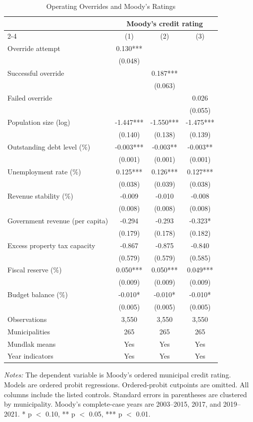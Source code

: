 \begin{table}[!htbp]
\centering
\caption{Operating Overrides and Moody's Ratings}
\label{tab:northeast_moodys_main}
\small
\begin{tabular}{lccc}
\toprule
 & \multicolumn{3}{c}{Moody's credit rating} \\
\cmidrule(lr){2-4}
 & (1) & (2) & (3) \\
\midrule
Override attempt & 0.130*** &  &  \\
 & (0.048) &  &  \\
Successful override &  & 0.187*** &  \\
 &  & (0.063) &  \\
Failed override &  &  & 0.026 \\
 &  &  & (0.055) \\
Population size (log) & -1.447*** & -1.550*** & -1.475*** \\
 & (0.140) & (0.138) & (0.139) \\
Outstanding debt level (\%) & -0.003*** & -0.003** & -0.003** \\
 & (0.001) & (0.001) & (0.001) \\
Unemployment rate (\%) & 0.125*** & 0.126*** & 0.127*** \\
 & (0.038) & (0.039) & (0.038) \\
Revenue stability (\%) & -0.009 & -0.010 & -0.008 \\
 & (0.008) & (0.008) & (0.008) \\
Government revenue (per capita) & -0.294 & -0.293 & -0.323* \\
 & (0.179) & (0.178) & (0.182) \\
Excess property tax capacity & -0.867 & -0.875 & -0.840 \\
 & (0.579) & (0.579) & (0.585) \\
Fiscal reserve (\%) & 0.050*** & 0.050*** & 0.049*** \\
 & (0.009) & (0.009) & (0.009) \\
Budget balance (\%) & -0.010* & -0.010* & -0.010* \\
 & (0.005) & (0.005) & (0.005) \\
\midrule
Observations & 3,550 & 3,550 & 3,550 \\
Municipalities & 265 & 265 & 265 \\
Mundlak means & Yes & Yes & Yes \\
Year indicators & Yes & Yes & Yes \\
\bottomrule
\end{tabular}
\vspace{0.05in}
\begin{minipage}{0.96\textwidth}\footnotesize\emph{Notes:} The dependent variable is Moody's ordered municipal credit rating. Models are ordered probit regressions. Ordered-probit cutpoints are omitted. All columns include the listed controls. Standard errors in parentheses are clustered by municipality. Moody's complete-case years are 2003--2015, 2017, and 2019--2021. * p $<$ 0.10, ** p $<$ 0.05, *** p $<$ 0.01.\end{minipage}
\end{table}
